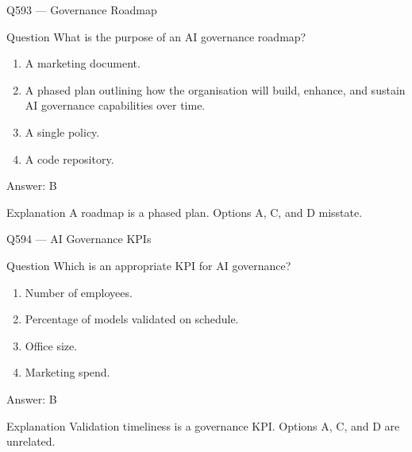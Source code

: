 \documentclass[aspectratio=169,8pt]{beamer}
\begin{document}
	\begin{frame}{Q593 --- Governance Roadmap}
		\begin{block}{Question}
			What is the purpose of an AI governance roadmap?
			\begin{enumerate}
				\item A marketing document.
				\item A phased plan outlining how the organisation will build, enhance, and sustain AI governance capabilities over time.
				\item A single policy.
				\item A code repository.
			\end{enumerate}
		\end{block}
		\begin{exampleblock}{Answer: B}\end{exampleblock}
		\begin{block}{Explanation}
			A roadmap is a phased plan. Options A, C, and D misstate.
		\end{block}
	\end{frame}
	
	\begin{frame}{Q594 --- AI Governance KPIs}
		\begin{block}{Question}
			Which is an appropriate KPI for AI governance?
			\begin{enumerate}
				\item Number of employees.
				\item Percentage of models validated on schedule.
				\item Office size.
				\item Marketing spend.
			\end{enumerate}
		\end{block}
		\begin{exampleblock}{Answer: B}\end{exampleblock}
		\begin{block}{Explanation}
			Validation timeliness is a governance KPI. Options A, C, and D are unrelated.
		\end{block}
	\end{frame}
	
\end{document}
